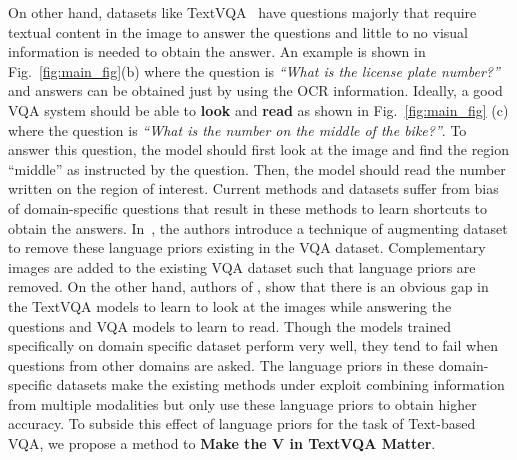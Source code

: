 \documentclass[10pt,twocolumn,letterpaper]{article}
\begin{document}
On other hand, datasets like TextVQA~\cite{textVQA} have questions majorly that require textual content in the image to answer the questions and little to no visual information is needed to obtain the answer. An example is shown in Fig.~\ref{fig:main_fig}(b) where the question is \textit{``What is the license plate number?''} and answers can be obtained just by using the OCR information. Ideally, a good VQA system should be able to \textbf{look} and \textbf{read} as shown in Fig.~\ref{fig:main_fig} (c) where the question is \textit{``What is the number on the middle of the bike?''}. To answer this question, the model should first look at the image and find the region ``middle'' as instructed by the question. Then, the model should read the number written on the region of interest. Current methods and datasets suffer from bias of domain-specific questions that result in these methods to learn shortcuts to obtain the answers. In~\cite{making_v_matter_vqa}, the authors introduce a technique of augmenting dataset to remove these language priors existing in the VQA dataset. Complementary images are added to the existing VQA dataset such that language priors are removed. On the other hand, authors of \cite{structured_multimodal_attention, towards_explainable_textvqa_model}, show that there is an obvious gap in the TextVQA models to learn to look at the images while answering the questions and VQA models to learn to read. Though the models trained specifically on domain specific dataset perform very well, they tend to fail when questions from other domains are asked. The language priors in these domain-specific datasets make the existing methods under exploit combining information from multiple modalities but only use these language priors to obtain higher accuracy. To subside this effect of language priors for the task of Text-based VQA, we propose a method to \textbf{Make the V in TextVQA Matter}.
\end{document}
